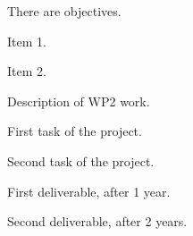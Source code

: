 \begin{workpackage}[id=WP2ID,wphases=0-48,
  short=First act. WP,%
  title=First actual Work Package,
  lead=KUL,
  KULRM=12,
  PAR2RM=6,
  PAR3RM=24]

\begin{wpobjectives}
  There are objectives.
  \begin{compactitem}
  \item Item 1.
  \item Item 2.
  \end{compactitem}
\end{wpobjectives}

\begin{wpdescription}
  Description of WP2 work.
\end{wpdescription}

\begin{tasklist}

  \begin{task}[title=TASK1,id=task1,PM=15,lead=KUL,wphases=0-30!0.5]

    First task of the project.
    
  \end{task}

  \begin{task}[title=TASK2,id=task2,PM=15,lead=PAR2,wphases=12-42!0.5]

    Second task of the project.
    
  \end{task}

\end{tasklist}

\begin{wpdelivs}
  \begin{wpdeliv}[due=12,id=mydeliv1,dissem=PU,nature=DEM,lead=KUL]
      {First deliverable, after 1 year.}
  \end{wpdeliv}
  \begin{wpdeliv}[due=24,id=mydeliv2,dissem=PU,nature=DEM,lead=PAR2]
      {Second deliverable, after 2 years.}
\end{wpdeliv}
\end{wpdelivs}

\end{workpackage}
